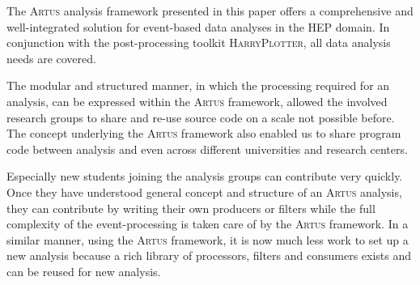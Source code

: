 \documentclass[3p]{elsarticle}
\newcommand{\software}[1]{\textsc{#1}\xspace}
\newcommand{\artus}{\software{Artus}}
\newcommand{\harryplotter}{\software{HarryPlotter}}
\begin{document}
The \artus analysis framework presented in this paper offers a comprehensive and well-integrated solution for event-based data analyses in the HEP domain.
In conjunction with the post-processing toolkit \harryplotter, all data analysis needs are covered.

The modular and structured manner, in which the processing required for an analysis, can be expressed within the \artus framework, allowed the involved research groups to share and re-use source code on a scale not possible before.
The concept underlying the \artus framework also enabled us to share program code between analysis and even across different universities and research centers.

Especially new students joining the analysis groups can contribute very quickly.
Once they have understood general concept and structure of an \artus analysis, they can contribute by writing their own producers or filters while the full complexity of the event-processing is taken care of by the \artus framework.
In a similar manner, using the \artus framework, it is now much less work to set up a new analysis because a rich library of processors, filters and consumers exists and can be reused for new analysis.

\vspace{2cm}

\end{document}
